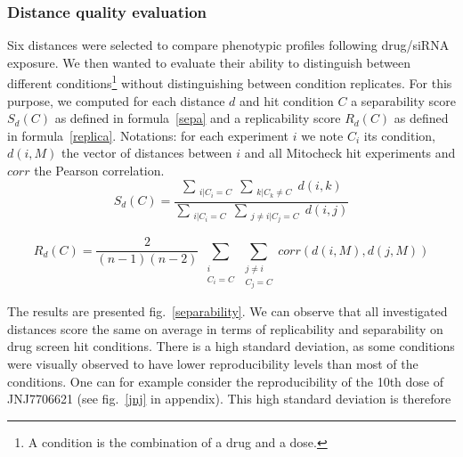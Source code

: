 \clearpage

\subsubsection{Distance quality evaluation}
Six distances were selected to compare phenotypic profiles following drug/siRNA exposure. We then wanted to evaluate their ability to distinguish between different conditions\footnote{A condition is the combination of a drug and a dose.} without distinguishing between condition replicates. For this purpose, we computed for each distance $d$ and hit condition $C$ a separability score $S_d(C)$ as defined in formula~\ref{sepa} and a replicability score $R_d(C)$ as defined in formula~\ref{replica}. Notations: for each experiment $i$ we note $C_i$ its condition, $d(i,M)$ the vector of distances between $i$ and all Mitocheck hit experiments and $corr$ the Pearson correlation.
\begin{equation}
S_d(C)=\dfrac{\sum_{\substack{i|C_i= C}} \sum_{\substack{k|C_k\neq C}} d(i,k)}{\sum_{\substack{i|C_i= C}} \sum_{\substack{j\neq i| C_j = C}} d(i,j)}
\label{sepa}
\end{equation}

\begin{equation}
R_d(C)=\dfrac{2}{(n-1)(n-2)}~ \sum_{\substack{i\\C_i= C}} \sum_{\substack{j\neq i\\ C_j = C}} corr(d(i,M), d(j,M))
\label{replica}
\end{equation}

The results are presented fig.~\ref{separability}. We can observe that all investigated distances score the same on average in terms of replicability and separability on drug screen hit conditions. There is a high standard deviation, as some conditions were visually observed to have lower reproducibility levels than most of the conditions. One can for example consider the reproducibility of the 10th dose of JNJ7706621 (see fig.~\ref{jnj} in appendix). This high standard deviation is therefore 


